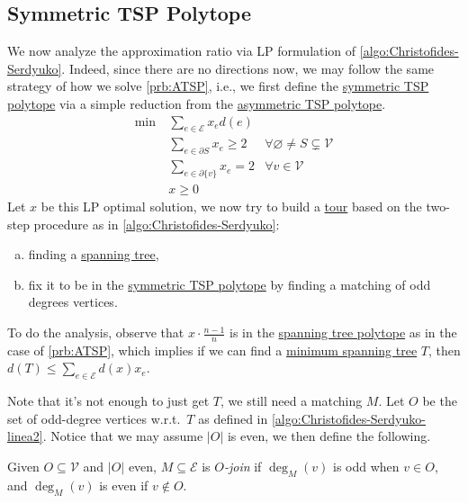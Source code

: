 \subsection{Symmetric TSP Polytope}
We now analyze the approximation ratio via LP formulation of \autoref{algo:Christofides-Serdyuko}. Indeed, since there are no directions now, we may follow the same strategy of how we solve \autoref{prb:ATSP}, i.e., we first define the \hyperref[eq:STSP-polytope]{symmetric TSP polytope} via a simple reduction from the \hyperref[eq:ATSP-polytope]{asymmetric TSP polytope}.
\begin{equation}\label{eq:STSP-polytope}
	\begin{aligned}
		\min~ & \sum_{e\in \mathcal{E} } x_e d(e)                                                      \\
		      & \sum_{e\in \partial S} x_e \geq 2  & \forall \varnothing \neq S \subsetneq \mathcal{V} \\
		      & \sum_{e\in \partial \{v\}} x_e = 2 & \forall v\in \mathcal{V}                          \\
		      & x \geq 0
	\end{aligned}
\end{equation}
Let \(x\) be this LP optimal solution, we now try to build a \hyperref[def:tour]{tour} based on the two-step procedure as in \autoref{algo:Christofides-Serdyuko}:
\begin{enumerate}[(a)]
	\item finding a \hyperref[def:spanning-tree]{spanning tree},
	\item fix it to be in the \hyperref[eq:STSP-polytope]{symmetric TSP polytope} by finding a matching of odd degrees vertices.
\end{enumerate}

To do the analysis, observe that \(x\cdot \frac{n-1}{n}\) is in the \hyperref[eq:spanning-tree-polytope]{spanning tree polytope} as in the case of \autoref{prb:ATSP}, which implies if we can find a \hyperref[prb:min-spanning-tree]{minimum spanning tree} \(T\), then \(d(T) \leq \sum_{e\in \mathcal{E} } d(x)x_e\).

Note that it's not enough to just get \(T\), we still need a matching \(M\). Let \(O\) be the set of odd-degree vertices w.r.t.\ \(T\) as defined in \autoref{algo:Christofides-Serdyuko-linea2}. Notice that we may assume \(\left\vert O \right\vert \) is even, we then define the following.

\begin{definition}[\(O\)-join]\label{def:O-join}
	Given \(O\subseteq \mathcal{V} \) and \(\left\vert O \right\vert \) even, \(M \subseteq \mathcal{E} \) is \emph{\(O\)-join} if \(\deg_M(v)\) is odd when \(v\in O\), and \(\deg_M(v)\) is even if \(v \notin O\).
\end{definition}

